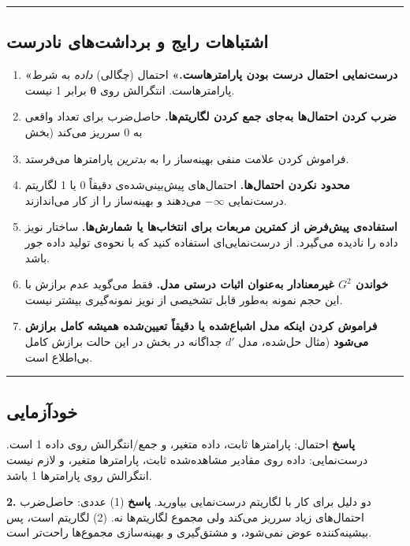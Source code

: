 \begin{center}\rule{0.5\linewidth}{0.5pt}\end{center}

\subsection{اشتباهات رایج و برداشت‌های نادرست}

\begin{enumerate}
\def\labelenumi{\arabic{enumi}.}
\tightlist
\item
  \textbf{«درست‌نمایی احتمال درست بودن پارامترهاست.»} احتمال (چگالی)
  \emph{داده} به شرط پارامترهاست. انتگرالش روی \(\boldsymbol\theta\)
  برابر 1 نیست.
\item
  \textbf{ضرب کردن احتمال‌ها به‌جای جمع کردن لگاریتم‌ها.} حاصل‌ضرب برای
  تعداد  واقعی به 0 سرریز می‌کند (بخش 
\item
  فراموش کردن علامت منفی بهینه‌ساز را به \emph{بدترین} پارامترها می‌فرستد.
\item
  \textbf{محدود نکردن احتمال‌ها.} احتمال‌های پیش‌بینی‌شده‌ی دقیقاً 0 یا 1
  لگاریتم درست‌نمایی \(-\infty\) می‌دهند و بهینه‌ساز را از کار می‌اندازند.
\item
  \textbf{استفاده‌ی پیش‌فرض از کمترین مربعات برای انتخاب‌ها یا شمارش‌ها.}
  ساختار نویز داده را نادیده می‌گیرد. از درست‌نمایی‌ای استفاده کنید که با
  نحوه‌ی تولید داده جور باشد.
\item
  \textbf{خواندن \(G^2\) غیرمعنادار به‌عنوان اثبات درستی مدل.} فقط می‌گوید
  عدم برازش با این حجم نمونه به‌طور قابل تشخیصی از نویز نمونه‌گیری بیشتر
  نیست.
\item
  \textbf{فراموش کردن اینکه مدل اشباع‌شده یا دقیقاً تعیین‌شده همیشه کامل
  برازش می‌شود} (مثال حل‌شده، مدل \(d'\) جداگانه در بخش  در این
  حالت برازش کامل بی‌اطلاع است.
\end{enumerate}

\begin{center}\rule{0.5\linewidth}{0.5pt}\end{center}

\subsection{خودآزمایی}

\textbf{پاسخ} احتمال: پارامترها ثابت، داده متغیر، و جمع/انتگرالش روی
داده 1 است. درست‌نمایی: داده روی مقادیر مشاهده‌شده ثابت، پارامترها متغیر،
و لازم نیست انتگرالش روی پارامترها 1 باشد.

\textbf{2.} دو دلیل برای کار با لگاریتم درست‌نمایی بیاورید. \textbf{پاسخ}
(1) عددی: حاصل‌ضرب احتمال‌های زیاد سرریز می‌کند ولی مجموع لگاریتم‌ها نه. (2)
لگاریتم  است، پس بیشینه‌کننده عوض نمی‌شود، و مشتق‌گیری و
بهینه‌سازی مجموع‌ها راحت‌تر است.

